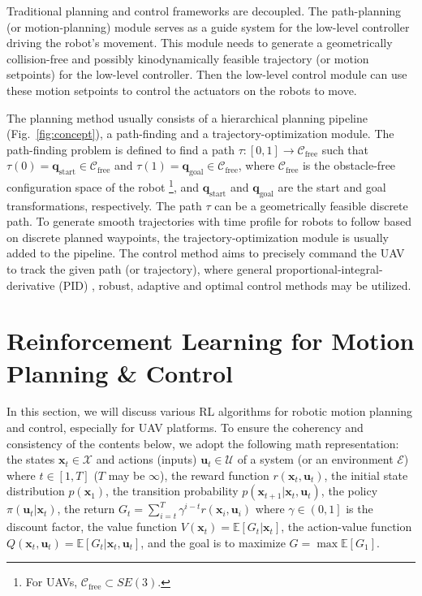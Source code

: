 \documentclass{article}
\newcommand{\B}[1]{\mathbf{#1}}
\newcommand{\robotConfig}{\mathcal{C}}
\begin{document}
Traditional planning and control frameworks are decoupled.
The path-planning (or motion-planning) module serves as a guide system 
for the low-level controller driving the robot's movement. 
This module needs to generate a geometrically 
collision-free and possibly kinodynamically feasible trajectory 
(or motion setpoints) for the low-level controller.
Then the low-level control module can use these motion 
setpoints to control the actuators on the robots to move.

The planning method usually consists of a hierarchical 
planning pipeline (Fig.~\ref{fig:concept}), a path-finding
and a trajectory-optimization module.
The path-finding problem is defined to 
find a path 
$
\tau : \left[0,1\right]\rightarrow \robotConfig_{\text{free}} 
$
such that  
$\tau(0) = \B{q}_{\text{start}} \in \robotConfig_{\text{free}}$ 
and
$\tau(1) = \B{q}_{\text{goal}} \in \robotConfig_{\text{free}}$, 
where $\robotConfig_\text{free}$ is the obstacle-free configuration space of the robot
\footnote{For UAVs, $\robotConfig_\text{free} \subset SE(3)$.}, 
and $\B{q}_{\text{start}}$ and $\B{q}_{\text{goal}}$ are the start and goal transformations, respectively.
The path $\tau$ can be a geometrically feasible discrete path.
To generate smooth trajectories with time profile 
for robots to 
follow based on discrete planned waypoints, the 
trajectory-optimization module is usually added to 
the pipeline. 
The control method aims to precisely command the 
UAV to track the given path (or trajectory), where 
general proportional-integral-derivative (PID) , 
robust, adaptive and optimal control methods may be utilized.


\section{Reinforcement Learning for Motion Planning \& Control}

In this section, we will discuss various RL algorithms for robotic 
motion planning and control, especially for UAV platforms. 
To ensure the coherency and consistency of the contents below, 
we adopt the following math representation: the states 
$\B{x}_t \in \boldsymbol{\mathcal{X}}$ 
and actions (inputs) $\B{u}_t \in \boldsymbol{\mathcal{U}}$ of a system (or an environment $\boldsymbol{\mathcal{E}}$) where $t\in\left[1,T\right]$ ($T$ may be $\infty$), 
the reward function $r(\B{x}_t, \B{u}_t)$, 
the initial state distribution $p(\B{x}_1)$, 
the transition probability $p(\B{x}_{t+1} | \B{x}_t, \B{u}_t)$, 
the policy $\pi(\B{u}_t | \B{x}_t)$, 
the return $G_t = \sum_{i=t}^T\gamma^{i-t}r(\B{x}_i, \B{u}_i)$ where $\gamma \in \left(0,1\right]$ is the discount factor, 
the value function $V(\B{x}_t) = \mathbb{E}\left[G_t | \B{x}_t\right]$, 
the action-value function $Q(\B{x}_t, \B{u}_t) = \mathbb{E}\left[G_t | \B{x}_t, \B{u}_t\right]$, 
and the goal is to maximize $G = \max \mathbb{E}\left[G_1 \right]$.
\end{document}
